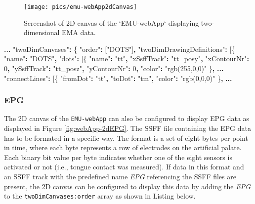 \documentclass[
]{book}
\newenvironment{Shaded}{\begin{snugshade}}{\end{snugshade}}
\newcommand{\DecValTok}[1]{\textcolor[rgb]{0.00,0.00,0.81}{#1}}
\newcommand{\NormalTok}[1]{#1}
\newcommand{\OperatorTok}[1]{\textcolor[rgb]{0.81,0.36,0.00}{\textbf{#1}}}
\newcommand{\StringTok}[1]{\textcolor[rgb]{0.31,0.60,0.02}{#1}}
\begin{document}
\begin{figure}

{\centering \texttt{[image: pics/emu-webApp2dCanvas]} 

}

\caption{Screenshot of 2D canvas of the `EMU-webApp` displaying two-dimensional EMA data.}\label{fig:webApp-2dCanvas}
\end{figure}

\begin{Shaded}
\begin{Highlighting}[]
\OperatorTok{...}
\StringTok{"twoDimCanvases"}\OperatorTok{:}\NormalTok{ \{}
    \StringTok{"order"}\OperatorTok{:}\NormalTok{ [}\StringTok{"DOTS"}\NormalTok{]}\OperatorTok{,}
    \StringTok{"twoDimDrawingDefinitions"}\OperatorTok{:}\NormalTok{ [\{}
        \StringTok{"name"}\OperatorTok{:} \StringTok{"DOTS"}\OperatorTok{,}
        \StringTok{"dots"}\OperatorTok{:}\NormalTok{ [\{}
            \StringTok{"name"}\OperatorTok{:} \StringTok{"tt"}\OperatorTok{,}
            \StringTok{"xSsffTrack"}\OperatorTok{:} \StringTok{"tt\_posy"}\OperatorTok{,}
            \StringTok{"xContourNr"}\OperatorTok{:} \DecValTok{0}\OperatorTok{,}
            \StringTok{"ySsffTrack"}\OperatorTok{:} \StringTok{"tt\_posz"}\OperatorTok{,}
            \StringTok{"yContourNr"}\OperatorTok{:} \DecValTok{0}\OperatorTok{,}
            \StringTok{"color"}\OperatorTok{:} \StringTok{"rgb(255,0,0)"}
\NormalTok{        \}}\OperatorTok{,}
\OperatorTok{...}
    \StringTok{"connectLines"}\OperatorTok{:}\NormalTok{ [\{}
        \StringTok{"fromDot"}\OperatorTok{:} \StringTok{"tt"}\OperatorTok{,}
        \StringTok{"toDot"}\OperatorTok{:} \StringTok{"tm"}\OperatorTok{,}
            \StringTok{"color"}\OperatorTok{:} \StringTok{"rgb(0,0,0)"}
\NormalTok{    \}}\OperatorTok{,}
\OperatorTok{...}
\end{Highlighting}
\end{Shaded}

\hypertarget{epg}{%
\subsubsection*{EPG}\label{epg}}

The 2D canvas of the \texttt{EMU-webApp} can also be configured to display EPG data as displayed in Figure \ref{fig:webApp-2dEPG}. The SSFF file containing the EPG data has to be formated in a specific way. The format is a set of eight bytes per point in time, where each byte represents a row of electrodes on the artificial palate. Each binary bit value per byte indicates whether one of the eight sensors is activated or not (i.e., tongue contact was measured). If data in this format and an SSFF track with the predefined name \emph{EPG} referencing the SSFF files are present, the 2D canvas can be configured to display this data by adding the \emph{EPG} to the \texttt{twoDimCanvases:order} array as shown in Listing below.
\end{document}
